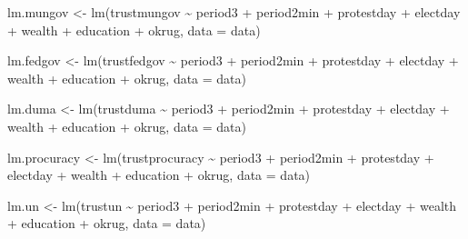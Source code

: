 \documentclass[
  letterpaper,
  DIV=11,
  numbers=noendperiod]{scrartcl}
\newenvironment{Shaded}{\begin{snugshade}}{\end{snugshade}}
\newcommand{\AttributeTok}[1]{\textcolor[rgb]{0.40,0.45,0.13}{#1}}
\newcommand{\FunctionTok}[1]{\textcolor[rgb]{0.28,0.35,0.67}{#1}}
\newcommand{\NormalTok}[1]{\textcolor[rgb]{0.00,0.23,0.31}{#1}}
\newcommand{\OtherTok}[1]{\textcolor[rgb]{0.00,0.23,0.31}{#1}}
\newcommand{\SpecialCharTok}[1]{\textcolor[rgb]{0.37,0.37,0.37}{#1}}
\begin{document}
\begin{Shaded}
\begin{Highlighting}[]
\NormalTok{lm.mungov }\OtherTok{\textless{}{-}} \FunctionTok{lm}\NormalTok{(trustmungov }\SpecialCharTok{\textasciitilde{}}\NormalTok{ period3 }\SpecialCharTok{+}\NormalTok{ period2min }\SpecialCharTok{+}\NormalTok{ protestday }\SpecialCharTok{+}\NormalTok{ electday }\SpecialCharTok{+}
\NormalTok{                    wealth }\SpecialCharTok{+}\NormalTok{ education }\SpecialCharTok{+}\NormalTok{ okrug, }\AttributeTok{data =}\NormalTok{ data) }

\NormalTok{lm.fedgov }\OtherTok{\textless{}{-}} \FunctionTok{lm}\NormalTok{(trustfedgov }\SpecialCharTok{\textasciitilde{}}\NormalTok{ period3 }\SpecialCharTok{+}\NormalTok{ period2min }\SpecialCharTok{+}\NormalTok{ protestday }\SpecialCharTok{+}\NormalTok{ electday }\SpecialCharTok{+}
\NormalTok{                    wealth }\SpecialCharTok{+}\NormalTok{ education }\SpecialCharTok{+}\NormalTok{ okrug, }\AttributeTok{data =}\NormalTok{ data) }

\NormalTok{lm.duma }\OtherTok{\textless{}{-}} \FunctionTok{lm}\NormalTok{(trustduma }\SpecialCharTok{\textasciitilde{}}\NormalTok{ period3 }\SpecialCharTok{+}\NormalTok{ period2min }\SpecialCharTok{+}\NormalTok{ protestday }\SpecialCharTok{+}\NormalTok{ electday }\SpecialCharTok{+}
\NormalTok{                    wealth }\SpecialCharTok{+}\NormalTok{ education }\SpecialCharTok{+}\NormalTok{ okrug, }\AttributeTok{data =}\NormalTok{ data) }

\NormalTok{lm.procuracy }\OtherTok{\textless{}{-}} \FunctionTok{lm}\NormalTok{(trustprocuracy }\SpecialCharTok{\textasciitilde{}}\NormalTok{ period3 }\SpecialCharTok{+}\NormalTok{ period2min }\SpecialCharTok{+}\NormalTok{ protestday }\SpecialCharTok{+}\NormalTok{ electday }\SpecialCharTok{+}
\NormalTok{                    wealth }\SpecialCharTok{+}\NormalTok{ education }\SpecialCharTok{+}\NormalTok{ okrug, }\AttributeTok{data =}\NormalTok{ data) }

\NormalTok{lm.un }\OtherTok{\textless{}{-}} \FunctionTok{lm}\NormalTok{(trustun }\SpecialCharTok{\textasciitilde{}}\NormalTok{ period3 }\SpecialCharTok{+}\NormalTok{ period2min }\SpecialCharTok{+}\NormalTok{ protestday }\SpecialCharTok{+}\NormalTok{ electday }\SpecialCharTok{+}
\NormalTok{                    wealth }\SpecialCharTok{+}\NormalTok{ education }\SpecialCharTok{+}\NormalTok{ okrug, }\AttributeTok{data =}\NormalTok{ data) }


\end{Highlighting}
\end{Shaded}
\end{document}

